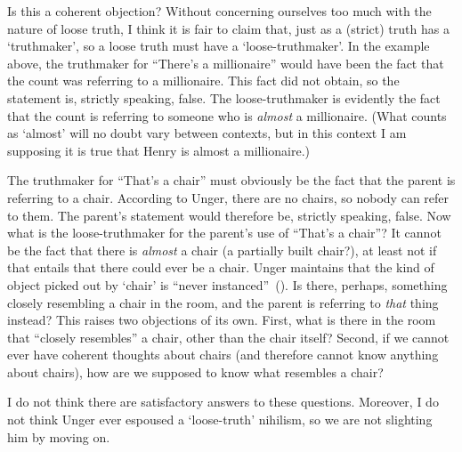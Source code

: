 \documentclass[11pt]{article}
\newcommand{\stage}[3]%
{%
	\begin{spacing}{1}%
	\vspace{0pt}
		\begin{description}[style=nextline, parsep=0pt, leftmargin=15mm, itemindent=-10mm, font=\mdseries]
			\item[\textsc{#1} \emph{#2}] #3
		\end{description}%
	\end{spacing}%
}
\begin{document}
\begin{spacing}{1.5}
Is this a coherent objection? Without concerning ourselves too much with the nature of loose truth, I think it is fair to claim that, just as a (strict) truth has a `truthmaker', so a loose truth must have a `loose-truthmaker'. In the example above, the truthmaker for ``There's a millionaire'' would have been the fact that the count was referring to a millionaire. This fact did not obtain, so the statement is, strictly speaking, false. The loose-truthmaker is evidently the fact that the count is referring to someone who is {\em almost} a millionaire. (What counts as `almost' will no doubt vary between contexts, but in this context I am supposing it is true that Henry is almost a millionaire.)

The truthmaker for ``That's a chair'' must obviously be the fact that the parent is referring to a chair. According to Unger, there are no chairs, so nobody can refer to them. The parent's statement would therefore be, strictly speaking, false. Now what is the loose-truthmaker for the parent's use of ``That's a chair''? It cannot be the fact that there is {\em almost} a chair (a partially built chair?), at least not if that entails that there could ever be a chair. Unger maintains that the kind of object picked out by `chair' is ``never instanced''~(\citeyear[147]{unger1979}). Is there, perhaps, something closely resembling a chair in the room, and the parent is referring to {\em that} thing instead? This raises two objections of its own. First, what is there in the room that ``closely resembles'' a chair, other than the chair itself? Second, if we cannot ever have coherent thoughts about chairs (and therefore cannot know anything about chairs), how are we supposed to know what resembles a chair?

I do not think there are satisfactory answers to these questions. Moreover, I do not think Unger ever espoused a `loose-truth' nihilism, so we are not slighting him by moving on.

%


\end{spacing}
\end{document}
